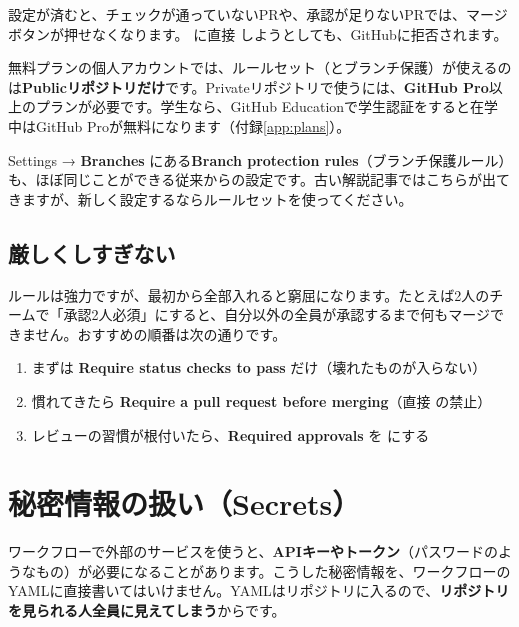 設定が済むと、チェックが通っていないPRや、承認が足りないPRでは、マージボタンが押せなくなります。 に直接  しようとしても、GitHubに拒否されます。

\begin{warnbox}
無料プランの個人アカウントでは、ルールセット（とブランチ保護）が使えるのは\textbf{Publicリポジトリだけ}です。Privateリポジトリで使うには、\textbf{GitHub Pro}以上のプランが必要です。学生なら、GitHub Educationで学生認証をすると在学中はGitHub Proが無料になります（付録\ref{app:plans}）。
\end{warnbox}

\begin{notebox}
Settings → \textbf{Branches} にある\textbf{Branch protection rules}（ブランチ保護ルール）も、ほぼ同じことができる従来からの設定です。古い解説記事ではこちらが出てきますが、新しく設定するならルールセットを使ってください。
\end{notebox}

\subsection{厳しくしすぎない}

ルールは強力ですが、最初から全部入れると窮屈になります。たとえば2人のチームで「承認2人必須」にすると、自分以外の全員が承認するまで何もマージできません。おすすめの順番は次の通りです。

\begin{enumerate}[leftmargin=1.6em]
  \item まずは \textbf{Require status checks to pass} だけ（壊れたものが入らない）
  \item 慣れてきたら \textbf{Require a pull request before merging}（直接  の禁止）
  \item レビューの習慣が根付いたら、\textbf{Required approvals} を  にする
\end{enumerate}

\section{秘密情報の扱い（Secrets）}

ワークフローで外部のサービスを使うと、\textbf{APIキーやトークン}（パスワードのようなもの）が必要になることがあります。こうした秘密情報を、ワークフローのYAMLに直接書いてはいけません。YAMLはリポジトリに入るので、\textbf{リポジトリを見られる人全員に見えてしまう}からです。

